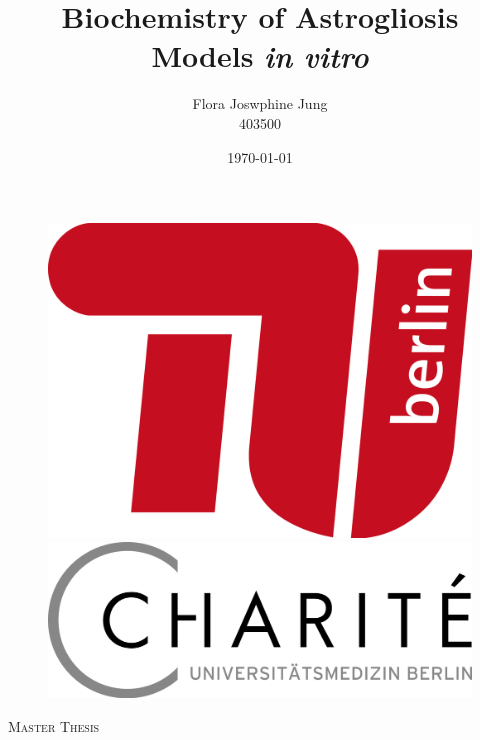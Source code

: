 \documentclass[a4paper,11pt,bibtotocnumbered]{article}
\begin{document}
\title{Biochemistry of Astrogliosis Models \textit{in vitro}}

\author{Flora Joswphine Jung\\
403500}
\date{\today}


\begin{titlepage}
	\centering
	\begin{figure}
   \begin{minipage}[b]{.15\linewidth} %
      \includegraphics[width=\linewidth]{Logo.png}
   \end{minipage}
   \hspace{.7\linewidth}%
   \begin{minipage}[b]{.2\linewidth} %
      \includegraphics[width=\linewidth]{LogoCharite.png}
   \end{minipage}
\end{figure}
	{\scshape\LARGE Master Thesis\par}
	\vspace{1cm}

\end{titlepage}
\end{document}
